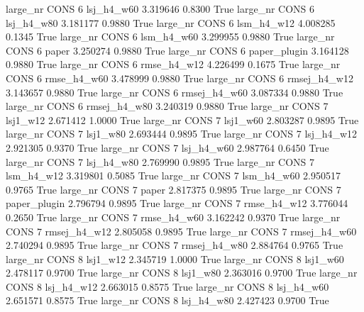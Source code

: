   large_nr     CONS                 6   lsj_h4_w60    3.319646      0.8300    True
  large_nr     CONS                 6   lsj_h4_w80    3.181177      0.9880    True
  large_nr     CONS                 6   lsm_h4_w12    4.008285      0.1345    True
  large_nr     CONS                 6   lsm_h4_w60    3.299955      0.9880    True
  large_nr     CONS                 6        paper    3.250274      0.9880    True
  large_nr     CONS                 6 paper_plugin    3.164128      0.9880    True
  large_nr     CONS                 6  rmse_h4_w12    4.226499      0.1675    True
  large_nr     CONS                 6  rmse_h4_w60    3.478999      0.9880    True
  large_nr     CONS                 6 rmsej_h4_w12    3.143657      0.9880    True
  large_nr     CONS                 6 rmsej_h4_w60    3.087334      0.9880    True
  large_nr     CONS                 6 rmsej_h4_w80    3.240319      0.9880    True
  large_nr     CONS                 7     lsj1_w12    2.671412      1.0000    True
  large_nr     CONS                 7     lsj1_w60    2.803287      0.9895    True
  large_nr     CONS                 7     lsj1_w80    2.693444      0.9895    True
  large_nr     CONS                 7   lsj_h4_w12    2.921305      0.9370    True
  large_nr     CONS                 7   lsj_h4_w60    2.987764      0.6450    True
  large_nr     CONS                 7   lsj_h4_w80    2.769990      0.9895    True
  large_nr     CONS                 7   lsm_h4_w12    3.319801      0.5085    True
  large_nr     CONS                 7   lsm_h4_w60    2.950517      0.9765    True
  large_nr     CONS                 7        paper    2.817375      0.9895    True
  large_nr     CONS                 7 paper_plugin    2.796794      0.9895    True
  large_nr     CONS                 7  rmse_h4_w12    3.776044      0.2650    True
  large_nr     CONS                 7  rmse_h4_w60    3.162242      0.9370    True
  large_nr     CONS                 7 rmsej_h4_w12    2.805058      0.9895    True
  large_nr     CONS                 7 rmsej_h4_w60    2.740294      0.9895    True
  large_nr     CONS                 7 rmsej_h4_w80    2.884764      0.9765    True
  large_nr     CONS                 8     lsj1_w12    2.345719      1.0000    True
  large_nr     CONS                 8     lsj1_w60    2.478117      0.9700    True
  large_nr     CONS                 8     lsj1_w80    2.363016      0.9700    True
  large_nr     CONS                 8   lsj_h4_w12    2.663015      0.8575    True
  large_nr     CONS                 8   lsj_h4_w60    2.651571      0.8575    True
  large_nr     CONS                 8   lsj_h4_w80    2.427423      0.9700    True
